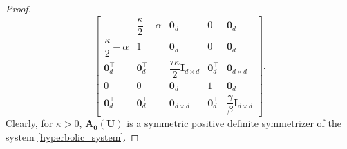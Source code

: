 \documentclass[10pt,a4paper]{amsart}
\begin{document}
\begin{proof}
\[\begin{bmatrix}
&
\dfrac{\kappa}{2}-\alpha
&
\mathbf 0_d&0&\mathbf 0_d
\\[0.8em]
\dfrac{\kappa}{2}-\alpha
&
1
&
\mathbf 0_d&0&\mathbf 0_d
\\[0.8em]
\mathbf 0_d^\top&\mathbf 0_d^\top&
\dfrac{\tau\kappa}{2}\mathbf I_{d\times d}
&
\mathbf 0_d^\top&\mathbf 0_{d\times d}
\\[0.8em]
0&0&\mathbf 0_d&1&\mathbf 0_d
\\[0.3em]
\mathbf 0_d^\top&\mathbf 0_d^\top&
\mathbf 0_{d\times d}&
\mathbf 0_d^\top&
\dfrac{\gamma}{\beta}\mathbf I_{d\times d}
\end{bmatrix}.
\]
Clearly, for $\kappa>0$, $\mathbf{A_0(U)}$ is a symmetric positive definite symmetrizer of the system \eqref{hyperbolic_system}.
\end{proof}
\end{document}
